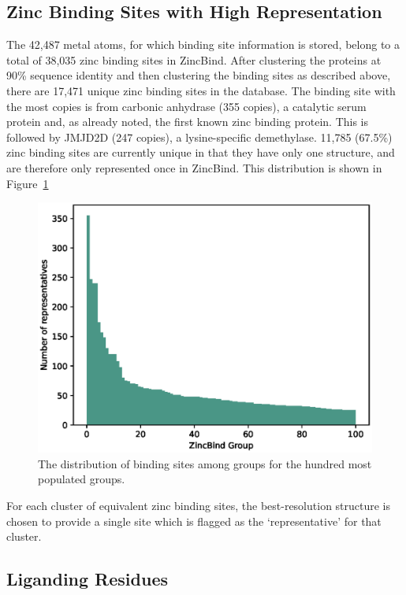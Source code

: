 \subsection{Zinc Binding Sites with High Representation}

The 42,487 metal atoms, for which binding site information is stored, belong to a total of 38,035 zinc binding sites in ZincBind. After clustering the proteins at 90\% sequence identity and then clustering the binding sites as described above, there are 17,471 unique zinc binding sites in the database. The binding site with the most copies is from carbonic anhydrase (355 copies), a catalytic serum protein and, as already noted, the first known zinc binding protein. This is followed by JMJD2D (247 copies), a lysine-specific demethylase. 11,785 (67.5\%) zinc binding sites are currently unique in that they have only one structure, and are therefore only represented once in ZincBind. This distribution is shown in Figure~\ref{fig:group-clusters}

\begin{figure}
\centering
\includegraphics[width=1.0\textwidth]{Figures/group-clusters.eps}
\caption{\label{fig:group-clusters} The distribution of binding sites among groups for the hundred most populated groups.}
\end{figure}

For each cluster of equivalent zinc binding sites, the best-resolution structure is chosen to provide a single site which is flagged as the `representative' for that cluster.

\subsection{Liganding Residues}


